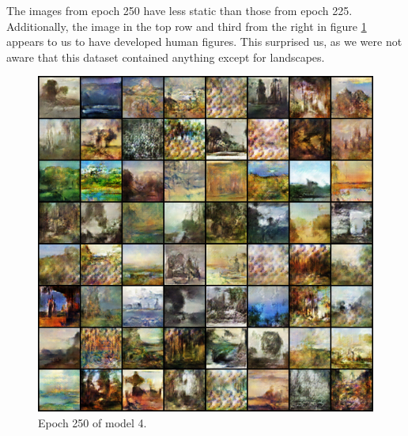 \documentclass[11pt,letterpaper]{article}
\begin{document}
				The images from epoch 250 have less static than those from epoch 225.
				Additionally, the image in the top row and third from the right in figure \ref{fig:wa64:epoch250generator} appears to us to have developed human figures.
				This surprised us, as we were not aware that this dataset contained anything except for landscapes.
				\begin{figure}
					\centering
					\includegraphics[width=1.0\linewidth]{results/model4/epoch250_generator}
					\caption{Epoch 250 of model 4.}
					\label{fig:wa64:epoch250generator}
				\end{figure}
\end{document}
